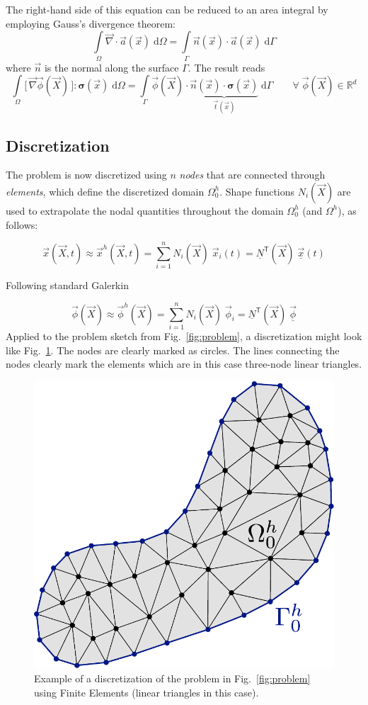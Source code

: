 \documentclass[times,namecite]{goose-article}
\begin{document}
The right-hand side of this equation can be reduced to an area integral by employing Gauss's divergence theorem:
\begin{equation}
  \int\limits_\Omega \vec{\nabla} \cdot \vec{a}(\vec{x}) \; \mathrm{d}\Omega
  =
  \int\limits_\Gamma \vec{n}(\vec{x}) \cdot \vec{a}(\vec{x}) \; \mathrm{d}\Gamma
\end{equation}
where $\vec{n}$ is the normal along the surface $\Gamma$. The result reads
\begin{equation}
  \int\limits_\Omega
    \big[\, \vec{\nabla} \vec{\phi}(\vec{X}) \,\big] : \bm{\sigma}(\vec{x}) \;
  \mathrm{d}\Omega
  =
  \int\limits_\Gamma
    \vec{\phi}(\vec{X}) \cdot
    \underbrace{
      \vec{n}(\vec{x}) \cdot \bm{\sigma}(\vec{x})
    }_{
      \vec{t}(\vec{x})
    } \;
  \mathrm{d}\Gamma
  \qquad
  \forall \; \vec{\phi}(\vec{X}) \in \mathbb{R}^d
\end{equation}

\subsection{Discretization}

The problem is now discretized using $n$ \emph{nodes} that are connected through \emph{elements}, which define the discretized domain $\Omega^h_0$. Shape functions $N_i(\vec{X})$ are used to extrapolate the nodal quantities throughout the domain $\Omega^h_0$ (and $\Omega^h$), as follows:

\begin{equation}
  \vec{x}(\vec{X},t)
  \approx
  \vec{x}^h(\vec{X},t)
  =
  \sum_{i=1}^{n} N_i (\vec{X}) \; \vec{x}_i (t)
  =
  \underline{N}^\mathsf{T} (\vec{X}) \; \underline{\vec{x}} (t)
\end{equation}

Following standard Galerkin

\begin{equation}
  \vec{\phi}(\vec{X})
  \approx
  \vec{\phi}^h(\vec{X})
  =
  \sum_{i=1}^{n} N_i (\vec{X}) \; \vec{\phi}_i
  =
  \underline{N}^\mathsf{T} (\vec{X}) \; \underline{\vec{\phi}}
\end{equation}
Applied to the problem sketch from Fig.~\ref{fig:problem}, a discretization might look like Fig.~\ref{fig:problem:discretized}. The nodes are clearly marked as circles. The lines connecting the nodes clearly mark the elements which are in this case three-node linear triangles.

\begin{figure}[htp]
  \centering
  \includegraphics[width=.25\textwidth]{figures/problem-discretized.pdf}
  \caption{Example of a discretization of the problem in Fig.~\ref{fig:problem} using Finite Elements (linear triangles in this case).}
  \label{fig:problem:discretized}
\end{figure}
\end{document}
